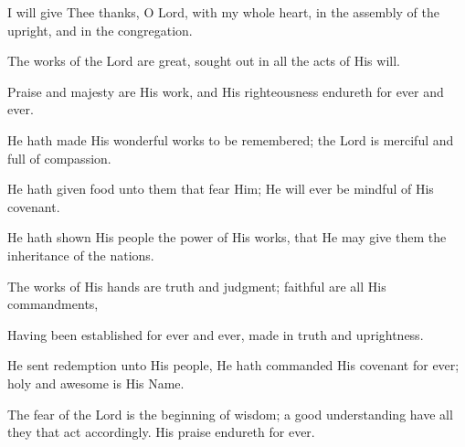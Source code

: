 I will give Thee thanks, O Lord, with my whole heart, in the assembly of the upright, and in the congregation.

The works of the Lord are great, sought out in all the acts of His will.

Praise and majesty are His work, and His righteousness endureth for ever and ever.

He hath made His wonderful works to be remembered; the Lord is merciful and full of compassion.

He hath given food unto them that fear Him; He will ever be mindful of His covenant.

He hath shown His people the power of His works, that He may give them the inheritance of the nations.

The works of His hands are truth and judgment; faithful are all His commandments,

Having been established for ever and ever, made in truth and uprightness.

He sent redemption unto His people, He hath commanded His covenant for ever; holy and awesome is His Name.

The fear of the Lord is the beginning of wisdom; a good understanding have all they that act accordingly. His praise endureth for ever.
